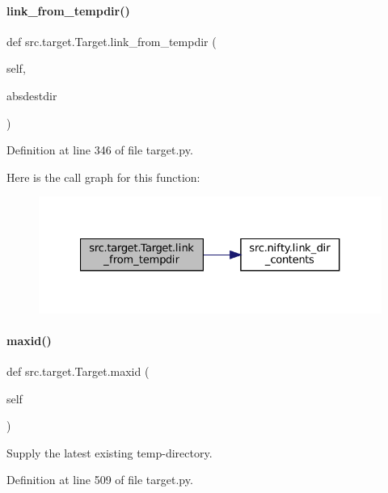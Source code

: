 \paragraph{\texorpdfstring{link\+\_\+from\+\_\+tempdir()}{link\_from\_tempdir()}}
{\footnotesize\ttfamily def src.\+target.\+Target.\+link\+\_\+from\+\_\+tempdir (\begin{DoxyParamCaption}\item[{}]{self,  }\item[{}]{absdestdir }\end{DoxyParamCaption})}



Definition at line 346 of file target.\+py.

Here is the call graph for this function\+:
\nopagebreak
\begin{figure}[H]
\begin{center}
\leavevmode
\includegraphics[width=327pt]{classsrc_1_1target_1_1Target_a558b52b23367b475a553567cd3ab5a8f_cgraph}
\end{center}
\end{figure}
\mbox{\label{classsrc_1_1target_1_1Target_a9517cd2799579d5fa5aa407fc79fff44}} 
\paragraph{\texorpdfstring{maxid()}{maxid()}}
{\footnotesize\ttfamily def src.\+target.\+Target.\+maxid (\begin{DoxyParamCaption}\item[{}]{self }\end{DoxyParamCaption})}



Supply the latest existing temp-\/directory. 



Definition at line 509 of file target.\+py.

\mbox{\label{classsrc_1_1target_1_1Target_ac295603ea071c6b6db55b7c2cf89890a}} 
